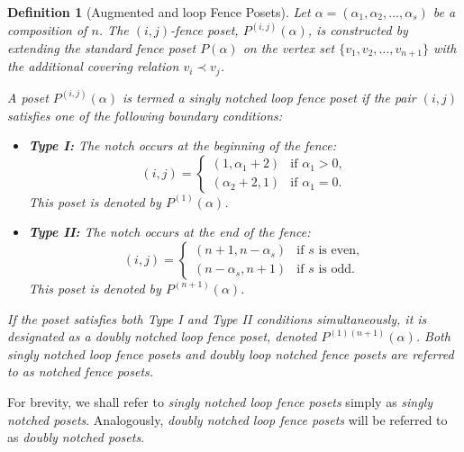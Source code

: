 \documentclass{article}
\newtheorem{definition}{Definition}
\theoremstyle{remark}
\begin{document}
\begin{definition}[Augmented and loop Fence Posets]
    Let $\alpha = (\alpha_1, \alpha_2, \ldots, \alpha_s)$ be a composition of $n$. The \emph{$(i,j)$-fence poset}, $P^{(i,j)}(\alpha)$, is constructed by extending the standard fence poset $P(\alpha)$ on the vertex set $\{v_1, v_2, \ldots, v_{n+1}\}$ with the additional covering relation $v_i \prec v_j$.

    A poset $P^{(i,j)}(\alpha)$ is termed a \emph{singly notched loop fence poset} if the pair $(i,j)$ satisfies one of the following boundary conditions:
    \begin{itemize}
        \item \textbf{Type I:} The notch occurs at the beginning of the fence:
        \[
        (i,j) = \begin{cases} 
            (1, \alpha_1 + 2) & \text{if } \alpha_1 > 0, \\ 
            (\alpha_2 + 2, 1) & \text{if } \alpha_1 = 0. 
        \end{cases}
        \]
        This poset is denoted by $P^{(1)}(\alpha)$.

        \item \textbf{Type II:} The notch occurs at the end of the fence:
        \[
        (i,j) = \begin{cases} 
            (n+1, n - \alpha_s) & \text{if } s \text{ is even}, \\ 
            (n - \alpha_s, n+1) & \text{if } s \text{ is odd}. 
        \end{cases}
        \]
        This poset is denoted by $P^{(n+1)}(\alpha)$.
    \end{itemize}

    If the poset satisfies both Type I and Type II conditions simultaneously, it is designated as a \emph{doubly notched loop fence poset}, denoted $P^{(1)(n+1)}(\alpha)$. Both singly notched loop fence posets and doubly loop notched fence posets are referred to as \emph{notched fence posets}.
\end{definition}

For brevity, we shall refer to \emph{singly notched loop fence posets} simply as \emph{singly notched posets}. Analogously, \emph{doubly notched loop fence posets} will be referred to as \emph{doubly notched posets}.
\end{document}
